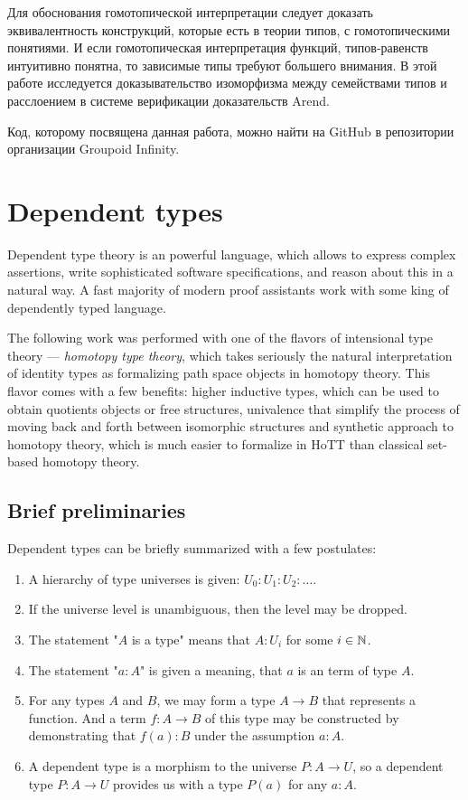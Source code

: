Для обоснования гомотопической интерпретации следует доказать эквивалентность конструкций, которые есть в теории типов, с гомотопическими понятиями. И если гомотопическая интерпретация функций, типов-равенств интуитивно понятна, то зависимые типы требуют большего внимания. В этой работе исследуется доказывательство изоморфизма между семействами типов и расслоением в системе верификации доказательств Arend. \autocite{Arend}  

Код, которому посвящена данная работа, можно найти на GitHub \autocite{Grp1} в репозитории организации Groupoid Infinity.

\section{Dependent types}

Dependent type theory is an powerful language, which allows to express complex assertions, write sophisticated software specifications, and reason about this in a natural way. A fast majority of modern proof assistants work with some king of dependently typed language. 

The following work was performed with one of the flavors of intensional type theory --- \textit{homotopy type theory}, which takes seriously the natural interpretation of identity types as formalizing path space objects in homotopy theory. This flavor comes with a few benefits: higher inductive types, which can be used to obtain quotients objects or free structures, univalence that simplify the process of moving back and forth between isomorphic structures and synthetic approach to homotopy theory, which is much easier to formalize in HoTT than classical set-based homotopy theory.

\subsection{Brief preliminaries}

Dependent types can be briefly summarized with a few postulates:
\begin{enumerate}
  \item A hierarchy of type universes is given: $U_0 : U_1 : U_2 : \dots$.
  \item If the universe level is unambiguous, then the level may be dropped.
  \item The statement "$A$ is a type" means that $A : U_i$ for some $i \in \mathbb N$.
  \item The statement "$a : A$" is given a meaning, that $a$ is an term of type $A$.
  \item For any types $A$ and $B$, we may form a type $A \to B$ that represents a function. And a term $f : A \to B$ of this type may be constructed by demonstrating that $f(a) : B$ under the assumption $a : A$.
  \item A dependent type is a morphism to the universe $P : A \to U$, so a dependent type $P : A \to U$ provides us with a type $P(a)$ for any $a : A$.
\end{enumerate}


